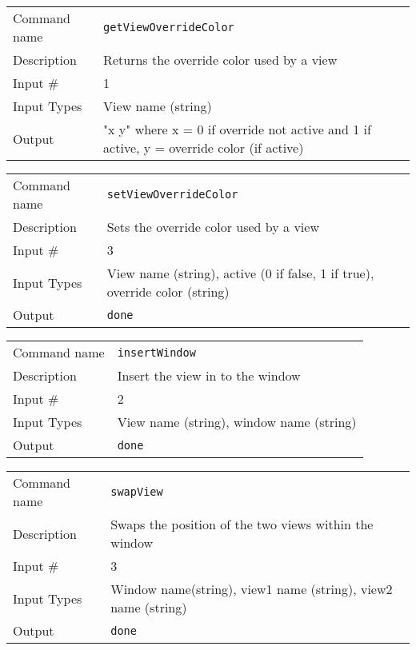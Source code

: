 \bigskip

\noindent
\begin{tabular}{l|p{5in}}
\hline
Command name & {\tt getViewOverrideColor} \\
Description  & Returns the override color used by a view \\
Input \#     & 1 \\
Input Types  & View name (string) \\
Output       & "x y" where x = 0 if override not active and 1 if active,
               y = override color (if active) \\
\hline
\end{tabular}

\bigskip

\noindent
\begin{tabular}{l|p{5in}}
\hline
Command name & {\tt setViewOverrideColor} \\
Description  & Sets the override color used by a view \\
Input \#     & 3 \\
Input Types  & View name (string), active (0 if false, 1 if true),
               override color (string) \\
Output       & {\tt done} \\
\hline
\end{tabular}

\bigskip

\noindent
\begin{tabular}{l|p{5in}}
\hline
Command name & {\tt insertWindow} \\
Description  & Insert the view in to the window \\
Input \#     & 2 \\
Input Types  & View name (string), window name (string) \\
Output       & {\tt done} \\
\hline
\end{tabular}

\bigskip

\noindent
\begin{tabular}{l|p{5in}}
\hline
Command name & {\tt swapView} \\
Description  & Swaps the position of the two views within the window \\
Input \#     & 3 \\
Input Types  & Window name(string), view1 name (string), view2 name (string) \\
Output       & {\tt done} \\
\hline
\end{tabular}


